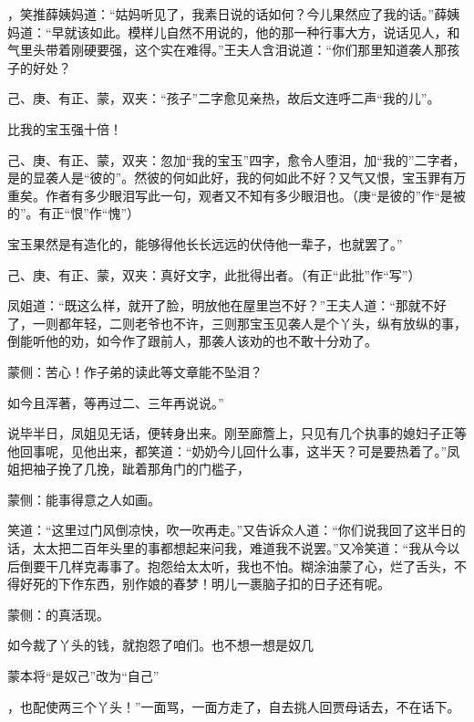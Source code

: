 \begin{parag}
，笑推薛姨妈道：“姑妈听见了，我素日说的话如何？今儿果然应了我的话。”薛姨妈道：“早就该如此。模样儿自然不用说的，他的那一种行事大方，说话见人，和气里头带着刚硬要强，这个实在难得。”王夫人含泪说道：“你们那里知道袭人那孩子的好处？\begin{note}己、庚、有正、蒙，双夹：“孩子”二字愈见亲热，故后文连呼二声“我的儿”。\end{note}比我的宝玉强十倍！\begin{note}己、庚、有正、蒙，双夹：忽加“我的宝玉”四字，愈令人堕泪，加“我的”二字者，是的显袭人是“彼的”。然彼的何如此好，我的何如此不好？又气又恨，宝玉罪有万重矣。作者有多少眼泪写此一句，观者又不知有多少眼泪也。（庚“是彼的”作“是被的”。有正“恨”作“愧”）\end{note}宝玉果然是有造化的，能够得他长长远远的伏侍他一辈子，也就罢了。”\begin{note}己、庚、有正、蒙，双夹：真好文字，此批得出者。（有正“此批”作“写”）\end{note}凤姐道：“既这么样，就开了脸，明放他在屋里岂不好？”王夫人道：“那就不好了，一则都年轻，二则老爷也不许，三则那宝玉见袭人是个丫头，纵有放纵的事，倒能听他的劝，如今作了跟前人，那袭人该劝的也不敢十分劝了。\begin{note}蒙侧：苦心！作子弟的读此等文章能不坠泪？\end{note}如今且浑著，等再过二、三年再说说。”
\end{parag}


\begin{parag}
    说毕半日，凤姐见无话，便转身出来。刚至廊簷上，只见有几个执事的媳妇子正等他回事呢，见他出来，都笑道：“奶奶今儿回什么事，这半天？可是要热着了。”凤姐把袖子挽了几挽，跐着那角门的门槛子，\begin{note}蒙侧：能事得意之人如画。\end{note}笑道：“这里过门风倒凉快，吹一吹再走。”又告诉众人道：“你们说我回了这半日的话，太太把二百年头里的事都想起来问我，难道我不说罢。”又冷笑道：“我从今以后倒要干几样克毒事了。抱怨给太太听，我也不怕。糊涂油蒙了心，烂了舌头，不得好死的下作东西，别作娘的春梦！明儿一裹脑子扣的日子还有呢。\begin{note}蒙侧：的真活现。\end{note}如今裁了丫头的钱，就抱怨了咱们。也不想一想是奴几\begin{note}蒙本将“是奴己”改为“自己”\end{note}，也配使两三个丫头！”一面骂，一面方走了，自去挑人回贾母话去，不在话下。
\end{parag}


